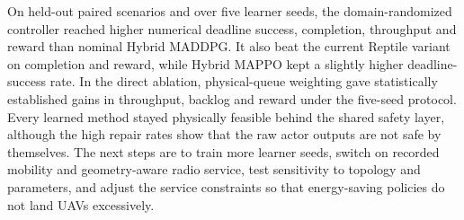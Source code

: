 \documentclass[journal]{IEEEtran}
\begin{document}
On held-out paired scenarios and over five learner seeds, the
domain-randomized controller reached higher numerical deadline success,
completion, throughput and reward than nominal Hybrid MADDPG. It also beat
the current Reptile variant on completion and reward, while Hybrid MAPPO kept
a slightly higher deadline-success rate. In the direct ablation,
physical-queue weighting gave statistically established gains in throughput,
backlog and reward under the five-seed protocol. Every learned method stayed
physically feasible behind the shared safety layer, although the high repair
rates show that the raw actor outputs are not safe by themselves. The next
steps are to train more learner seeds, switch on recorded mobility and
geometry-aware radio service, test sensitivity to topology and parameters,
and adjust the service constraints so that energy-saving policies do not
land UAVs excessively.
\end{document}
